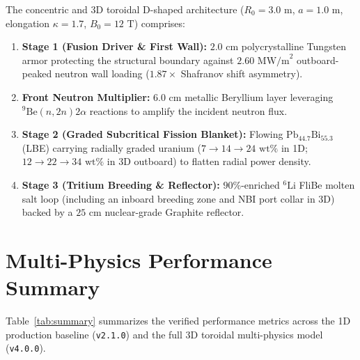 \documentclass[11pt,twocolumn]{article}
\begin{document}
The concentric and 3D toroidal D-shaped architecture ($R_0 = 3.0\text{ m}$, $a = 1.0\text{ m}$, elongation $\kappa = 1.7$, $B_0 = 12\text{ T}$) comprises:
\begin{enumerate}
    \item \textbf{Stage 1 (Fusion Driver \& First Wall):} $2.0\text{ cm}$ polycrystalline Tungsten armor protecting the structural boundary against $2.60\text{ MW/m}^2$ outboard-peaked neutron wall loading ($1.87\times$ Shafranov shift asymmetry).
    \item \textbf{Front Neutron Multiplier:} $6.0\text{ cm}$ metallic Beryllium layer leveraging $^9\mathrm{Be}(n,2n)2\alpha$ reactions to amplify the incident neutron flux.
    \item \textbf{Stage 2 (Graded Subcritical Fission Blanket):} Flowing $\mathrm{Pb}_{44.7}\mathrm{Bi}_{55.3}$ (LBE) carrying radially graded uranium ($7 \rightarrow 14 \rightarrow 24\text{ wt\%}$ in 1D; $12 \rightarrow 22 \rightarrow 34\text{ wt\%}$ in 3D outboard) to flatten radial power density.
    \item \textbf{Stage 3 (Tritium Breeding \& Reflector):} $90\%$-enriched $^6\mathrm{Li}$ FliBe molten salt loop (including an inboard breeding zone and NBI port collar in 3D) backed by a $25\text{ cm}$ nuclear-grade Graphite reflector.
\end{enumerate}

\section{Multi-Physics Performance Summary}
Table~\ref{tab:summary} summarizes the verified performance metrics across the 1D production baseline (\texttt{v2.1.0}) and the full 3D toroidal multi-physics model (\texttt{v4.0.0}).
\end{document}
